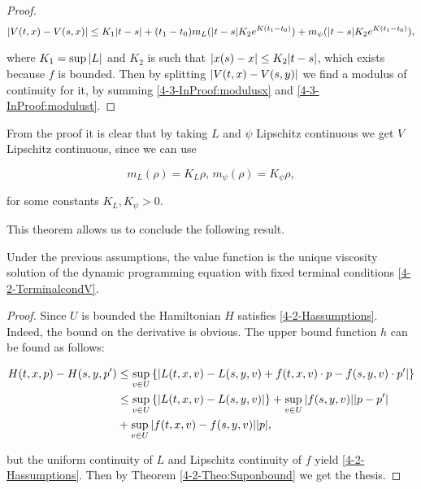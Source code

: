 \begin{theorem}
\begin{proof}
        \begin{equation}\label{4-3-InProof:modulusx}
            \abs{V(t,x)-V(s,x)} \leq K_1\abs{t-s} + (t_1-t_0)m_L(\abs{t-s}K_2e^{K(t_1-t_0)}) + m_{\psi}(\abs{t-s}K_2e^{K(t_1-t_0)}),
        \end{equation}

        where $K_1=\sup\abs{L}$ and $K_2$ is such that $\abs{x(s)-x}\leq K_2\abs{t-s}$, which exists because $f$ is bounded. Then by splitting 
        $\abs{V(t,x)-V(s,y)}$ we find a modulus of continuity for it, by summing \ref{4-3-InProof:modulusx} and \ref{4-3-InProof:modulust}. 
    \end{proof}
\end{theorem}

From the proof it is clear that by taking $L$ and $\psi$ Lipschitz continuous we get $V$ Lipschitz continuous, since we can use 

\[m_L(\rho)=K_L\rho,\, m_{\psi}(\rho)=K_{\psi}\rho,\]

for some constants $K_L,K_{\psi}>0$. 

This theorem allows us to conclude the following result.

\begin{corollary} 
    Under the previous assumptions, the value function is the unique viscosity solution of the dynamic programming equation with fixed terminal conditions \ref{4-2-TerminalcondV}. 

    \begin{proof} 
        Since $U$ is bounded the Hamiltonian $H$ satisfies \ref{4-2-Hassumptions}. Indeed, the bound on the derivative is obvious. 
        The upper bound function $h$ can be found as follows:

        \begin{align*}
            H(t,x,p) - H(s,y,p') & \leq \sup_{v\in U}\left\{\abs{L(t,x,v)-L(s,y,v) + f(t,x,v)\cdot p - f(s,y,v)\cdot p'}\right\} \\
            & \leq \sup_{v\in U}\left\{\abs{L(t,x,v)-L(s,y,v)}\right\} + \sup_{v\in U}\abs{f(s,y,v)}\abs{p-p'} \\
            & + \sup_{v\in U}\abs{f(t,x,v)-f(s,y,v)}\abs{p},
        \end{align*}

        but the uniform continuity of $L$ and Lipschitz continuity of $f$ yield \ref{4-2-Hassumptions}. Then by Theorem \ref{4-2-Theo:Suponbound} we get the thesis.
    \end{proof} 
\end{corollary}

